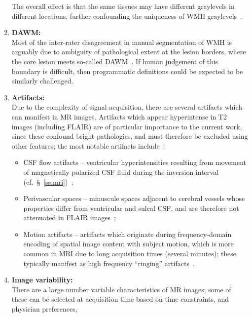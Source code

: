 \begin{enumerate}[itemsep=0pt,topsep=0pt]
    The overall effect is that
    the same tissues may have different graylevels in different locations,
    further confounding the uniqueness of WMH graylevels~\cite{Wardlaw2015}.
  \item\label{chauto:dawm}
  \textbf{DAWM:}\\
    Most of the inter-rater disagreement in manual segmentation of WMH is arguably due to
    ambiguity of pathological extent at the lesion borders,
    where the core lesion meets so-called DAWM~\cite{Ge2003}.
    If human judgement of this boundary is difficult,
    then programmatic definitions could be expected to be similarly challenged.
  \item\label{chauto:artifacts} 
  \textbf{Artifacts:}\\
    Due to the complexity of signal acquisition,
    there are several artifacts which can manifest in MR images.
    Artifacts which appear hyperintense in T2 images (including FLAIR)
    are of particular importance to the current work, since these confound bright pathologies,
    and must therefore be excluded using other features;
    the most notable artifacts include~\cite{Wardlaw2015}:
    \begin{itemize}[itemsep=0pt,topsep=0pt]
      \item CSF flow artifacts -- 
      ventricular hyperintensities resulting from movement of magnetically polarized CSF fluid
      during the inversion interval (cf.~\S~\ref{ss:mri})~\cite{Bakshi2000};  
      \item Perivascular spaces --
      minuscule spaces adjacent to cerebral vessels
      whose properties differ from ventricular and sulcal CSF,
      and are therefore not attenuated in FLAIR images~\cite{Wardlaw2015};
      \item Motion artifacts --
      artifacts which originate during frequency-domain encoding of spatial image content
      with subject motion, which is more common in MRI due to
      long acquisition times (several minutes);
      these typically manifest as high frequency ``ringing'' artifacts~\cite{Zaitsev2015}.
    \end{itemize}
  \item\label{chauto:variability}
  \textbf{Image variability:}\\
    There are a large number variable characteristics of MR images;
    some of these can be selected at acquisition time based on
    time constraints, and physician preferences,

\end{enumerate}
